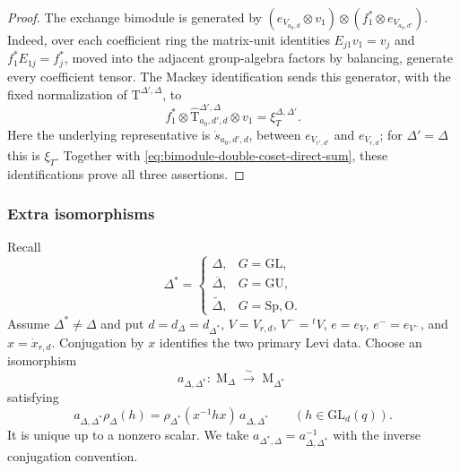 \documentclass[12pt]{amsart}
\numberwithin{itemcounter}{subsection}
\theoremstyle{plain}
\theoremstyle{definition}
\theoremstyle{remark}
\numberwithin{equation}{section}
\def\O{\mathrm{O}}
\def\Sp{\mathrm{Sp}}
\def\GL{\mathrm{GL}}
\def\GU{\mathrm{GU}}
\def\M{{\operatorname{M}\nolimits}}
\begin{document}
\begin{proof}
The exchange bimodule is generated by
\((e_{V_{a_0,d}}\otimes v_1)\otimes(f_1^*\otimes e_{V_{a_0,d'}})\).
Indeed, over each coefficient ring the matrix-unit identities
\(E_{j1}v_1=v_j\) and \(f_1^*E_{1j}=f_j^*\), moved into the adjacent
group-algebra factors by balancing, generate every coefficient tensor.
The Mackey identification sends this generator, with the fixed
normalization of \(\mathrm T^{\Delta',\Delta}\), to
\[
f_1^*\otimes\widehat{\mathrm T}^{\Delta',\Delta}_{a_0,d',d}\otimes v_1
=\xi_T^{\Delta,\Delta'}.
\]
Here the underlying representative is \(\dot s_{a_0,d',d}\), between
\(e_{V_{r',d'}}\) and \(e_{V_{r,d}}\); for \(\Delta'=\Delta\) this is
\(\xi_T\).  Together with
\eqref{eq:bimodule-double-coset-direct-sum}, these identifications prove
all three assertions.
\end{proof}

\subsubsection{Extra isomorphisms}
Recall
\[
\Delta^*=\begin{cases}
\Delta,&G=\GL,\\
\overline\Delta,&G=\GU,\\
\widetilde\Delta,&G=\Sp,\O.
\end{cases}
\]
Assume $\Delta^*\neq\Delta$ and put $d=d_\Delta=d_{\Delta^*}$,
$V=V_{r,d}$, $V^-={}^tV$, $e=e_V$, $e^-=e_{V^-}$, and
$x=\dot x_{r,d}$.  Conjugation by $x$ identifies the two primary Levi
data.  Choose an isomorphism
\[
a_{\Delta,\Delta^*}:\M_\Delta\xrightarrow{\sim}\M_{\Delta^*}
\]
satisfying
\begin{equation}\label{eq:a-Gamma-dual}
a_{\Delta,\Delta^*}\rho_\Delta(h)
 =\rho_{\Delta^*}(x^{-1}hx)\,a_{\Delta,\Delta^*}
\qquad(h\in\GL_d(q)).
\end{equation}
It is unique up to a nonzero scalar.  We take
$a_{\Delta^*,\Delta}=a_{\Delta,\Delta^*}^{-1}$ with the inverse conjugation
convention.
\end{document}
